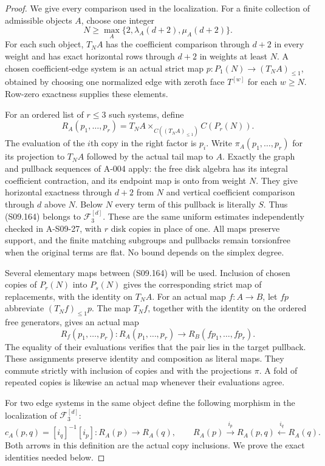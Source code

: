 \begin{proof}
We give every comparison used in the localization.
For a finite collection of admissible objects $A$, choose
one integer
\[
 N\geq\max_A\{2,\lambda_A(d+2),\mu_A(d+2)\}.
 \tag{S09.163}
\]
For each such object, $T_NA$ has the coefficient comparison
through $d+2$ in every weight and has exact horizontal rows
through $d+2$ in weights at least $N$.
A chosen coefficient-edge system is an actual strict map
$p:P_1(N)\to(T_NA)_{\leq1}$, obtained by choosing one
normalized edge with zeroth face $T^{[w]}$ for each $w\geq N$.
Row-zero exactness supplies these elements.

For an ordered list of $r\leq3$ such systems, define
\[
 R_A(p_1,\ldots,p_r)
   =T_NA\mathop{\times}_{C((T_NA)_{\leq1})}
                  C(P_r(N)).
 \tag{S09.164}
\]
The evaluation of the $i$th copy in the right factor is $p_i$.
Write $\pi_A(p_1,\ldots,p_r)$ for its projection to $T_NA$
followed by the actual tail map to $A$.
Exactly the graph and pullback sequences of A-004 apply:
the free disk algebra has its integral coefficient contraction,
and its endpoint map is onto from weight $N$.
They give horizontal exactness through $d+2$ from $N$
and vertical coefficient comparison through $d$ above $N$.
Below $N$ every term of this pullback is literally $S$.
Thus (S09.164) belongs to $\mathcal F_3^{[d]}$.
These are the same uniform estimates independently checked
in A-S09-27, with $r$ disk copies in place of one.
All maps preserve support, and the finite matching subgroups
and pullbacks remain torsionfree when the original terms are
flat. No bound depends on the simplex degree.

Several elementary maps between (S09.164) will be used.
Inclusion of chosen copies of $P_r(N)$ into $P_s(N)$ gives
the corresponding strict map of replacements, with the
identity on $T_NA$. For an actual map $f:A\to B$, let
$fp$ abbreviate $(T_Nf)_{\leq1}p$.
The map $T_Nf$, together with the identity on the ordered
free generators, gives an actual map
\[
 R_f(p_1,\ldots,p_r):R_A(p_1,\ldots,p_r)
                         \longrightarrow R_B(fp_1,\ldots,fp_r).
\]
The equality of their evaluations verifies that the pair
lies in the target pullback. These assignments preserve
identity and composition as literal maps. They commute
strictly with inclusion of copies and with the projections
$\pi$. A fold of repeated copies is likewise an actual map
whenever their evaluations agree.

For two edge systems in the same object define the following
morphism in the localization of $\mathcal F_3^{[d]}$:
\[
 c_A(p,q)=[i_q]^{-1}[i_p]:R_A(p)\longrightarrow R_A(q),
 \qquad
 R_A(p)\xrightarrow{i_p}R_A(p,q)\xleftarrow{i_q}R_A(q).
 \tag{S09.165}
\]
Both arrows in this definition are the actual copy inclusions.
We prove the exact identities needed below.


\end{proof}
